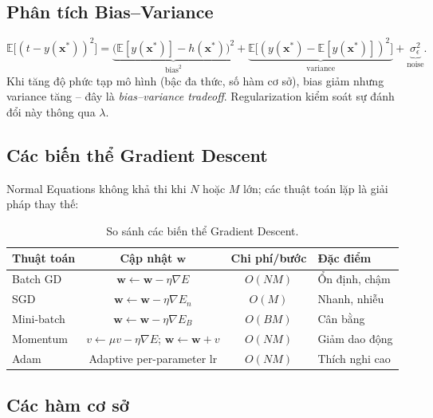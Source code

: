 \documentclass[12pt,a4paper]{article}
\begin{document}
\subsection{Phân tích Bias--Variance}

\begin{equation}
  \mathbb{E}\bigl[(t - y(\mathbf{x}^*))^2\bigr]
  = \underbrace{\bigl(\mathbb{E}[y(\mathbf{x}^*)] - h(\mathbf{x}^*)\bigr)^2}_{\text{bias}^2}
  + \underbrace{\mathbb{E}\bigl[(y(\mathbf{x}^*) - \mathbb{E}[y(\mathbf{x}^*)])^2\bigr]}_{\text{variance}}
  + \underbrace{\sigma^2_\epsilon}_{\text{noise}}.
  \label{eq:bias_variance}
\end{equation}
Khi tăng độ phức tạp mô hình (bậc đa thức, số hàm cơ sở), bias giảm nhưng variance
tăng -- đây là \emph{bias--variance tradeoff}. Regularization kiểm soát sự đánh đổi
này thông qua $\lambda$.

\subsection{Các biến thể Gradient Descent}

Normal Equations không khả thi khi $N$ hoặc $M$ lớn; các thuật toán lặp là giải pháp
thay thế:

\begin{table}[H]
  \centering
  \caption{So sánh các biến thể Gradient Descent.}
  \label{tab:gd_variants}
  \begin{tabular}{lccl}
    \toprule
    \textbf{Thuật toán} & \textbf{Cập nhật $\mathbf{w}$} & \textbf{Chi phí/bước} & \textbf{Đặc điểm} \\
    \midrule
    Batch GD   & $\mathbf{w} \leftarrow \mathbf{w} - \eta\nabla E$               & $O(NM)$ & Ổn định, chậm \\
    SGD        & $\mathbf{w} \leftarrow \mathbf{w} - \eta\nabla E_n$             & $O(M)$  & Nhanh, nhiễu \\
    Mini-batch & $\mathbf{w} \leftarrow \mathbf{w} - \eta\nabla E_B$             & $O(BM)$ & Cân bằng \\
    Momentum   & $v \leftarrow \mu v - \eta\nabla E$; $\mathbf{w} \leftarrow \mathbf{w}+v$ & $O(NM)$ & Giảm dao động \\
    Adam       & Adaptive per-parameter lr                                         & $O(NM)$ & Thích nghi cao \\
    \bottomrule
  \end{tabular}
\end{table}

\subsection{Các hàm cơ sở}
\end{document}
